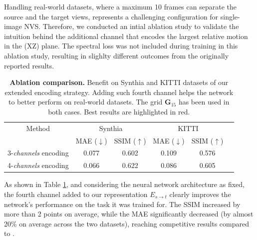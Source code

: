 Handling real-world datasets, where a maximum 10 frames can separate the source and the target views, represents a challenging configuration for single-image \ac{NVS}. Therefore, we conducted an intial ablation study to validate the intuition behind the additional channel that encodes the largest relative motion in the (XZ) plane. The spectral loss was not included during training in this ablation study, resulting in slighlty different outcomes from the originally reported results. 

\begin{table}[h!]
    \caption{\textbf{Ablation comparison.} Benefit on Synthia \citep{ros2016synthia} and KITTI \citep{geiger2012we} datasets of our extended encoding strategy. Adding such fourth channel helps the network to better perform on real-world datasets. The grid $\textbf{G}_{15}$ has been used in both cases. Best results are highlighted in \colorbox{red!25}{red}. }
    \label{tab:compExtended}
    \begin{center}%
    \begin{adjustbox}{width =.8\linewidth}
    \begin{tabular}[h]{c||ccccc}
    \hline
      Method & \multicolumn{2}{c}{Synthia} & \multicolumn{2}{c}{KITTI} \\
      &  MAE ($\downarrow$) & SSIM ($\uparrow$) & MAE ($\downarrow$) & SSIM ($\uparrow$) \\
    \hline
    3-\textit{channels} encoding & 0.077 & 0.602 & 0.109 & 0.576  \\
    4-\textit{channels} encoding & \cellcolor{red!25}0.066 & \cellcolor{red!25}0.622 & \cellcolor{red!25}0.086 & \cellcolor{red!25}0.605 \\
    \hline 
    \end{tabular}
    \end{adjustbox}
    \end{center}
    \end{table}

As shown in Table \ref{tab:compExtended}, and considering the neural network architecture as fixed, the fourth channel added to our representation $E_{s\xrightarrow{}t}$ clearly improves the network's performance on the task it was trained for. The SSIM increased by more than 2 points on average, while the \ac{MAE} significantly decreased (by almost 20\% on average across the two datasets), reaching competitive results compared to \cite{kim2020novel}. 

